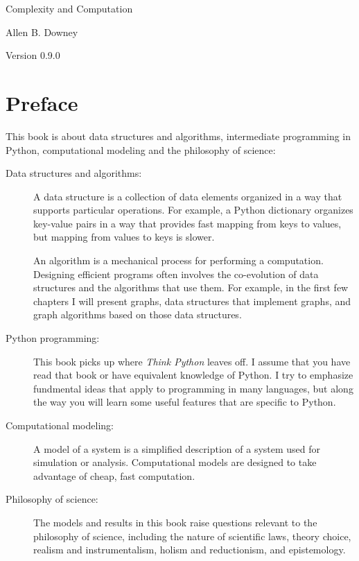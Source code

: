 \documentclass[10pt]{book}
\newcommand{\thetitle}{Complexity and Computation}
\newcommand{\theversion}{0.9.0}
\begin{document}

\begin{htmlonly}


{\Large \thetitle}

{\large Allen B. Downey}

Version \theversion

\setcounter{chapter}{-1}

\end{htmlonly}

\chapter{Preface}

This book is about data structures and algorithms, intermediate
programming in Python, computational modeling and
the philosophy of science:

\begin{description}

\item[Data structures and algorithms:] A data structure is a
  collection of data elements organized in a way that supports
  particular operations.  For example, a Python dictionary organizes
  key-value pairs in a way that provides fast mapping from keys to
  values, but mapping from values to keys is slower.

An algorithm is a mechanical process for performing a computation.
Designing efficient programs often involves the co-evolution of data
structures and the algorithms that use them.  For example, in the
first few chapters I will present graphs, data structures that
implement graphs, and graph algorithms based on those data structures.

\item[Python programming:] This book picks up where {\em Think Python}
  leaves off.  I assume that you have read that book or have
  equivalent knowledge of Python.  I try to emphasize fundmental ideas
  that apply to programming in many languages, but along the way you
  will learn some useful features that are specific to Python.

\item[Computational modeling:] A model of a system is a simplified
  description of a system used for simulation or analysis.
  Computational models are designed to take advantage of cheap, fast
  computation.

\item[Philosophy of science:] The models and results in this book
  raise questions relevant to the philosophy of science,
  including the nature of scientific laws, theory choice, realism and
  instrumentalism, holism and reductionism, and epistemology.

\end{description}
\end{document}
